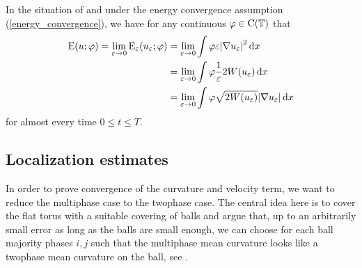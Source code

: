 \begin{lemma}
	\label{equipartition_of_energies_multiphase}
	In the situation of  and under 
	the energy convergence assumption (\ref{energy_convergence}), we have for 
	any continuous $ \varphi \in \operatorname{C} ( \operatorname{\mathbb{T}} ) $ that
	\begin{align*}
		\operatorname{E} ( u ; \varphi )
		=
		\lim_{ \varepsilon \to 0 }
		\operatorname{E}_{ \varepsilon } ( u_{ \varepsilon } ; \varphi )
		& =
		\lim_{ \varepsilon \to 0 }
		\int
		\varphi
		\varepsilon
		\abs{ \nabla u_{ \varepsilon } }^{ 2 }
		\dd{ x }
		\\
		& =
		\lim_{ \varepsilon \to 0 }
		\int
		\varphi
		\frac{ 1 }{ \varepsilon } 2 W ( u_{ \varepsilon } )
		\dd{ x }
		\\
		& =
		\lim_{ \varepsilon \to 0 }
		\int
		\varphi
		\sqrt{ 2 W ( u_{ \varepsilon } ) }
		\abs{ \nabla u_{ \varepsilon } }
		\dd{ x }
	\end{align*}
	for almost every time $ 0 \leq t \leq T $.
\end{lemma}

\subsection{Localization estimates}
\label{section_localization_estimates}
In order to prove convergence of the curvature and velocity term, we want to 
reduce the multiphase case to the twophase case. The central idea here is to 
cover the flat torus with a suitable covering of balls and argue that, up to an 
arbitrarily small error as long as the balls are small enough, we can choose 
for each ball majority phases $ i, j $ such that the multiphase mean curvature 
looks like a twophase mean curvature on the ball, see 
.

